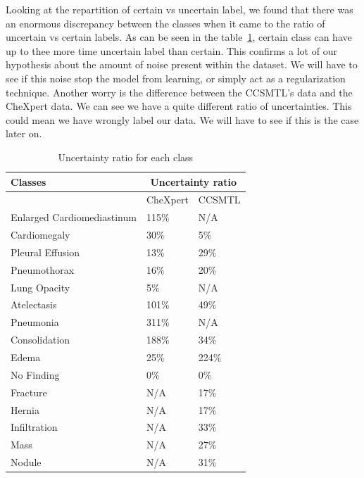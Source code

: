 \documentclass[11pt]{article}
\begin{document}
    Looking at the repartition of certain vs uncertain label, we found that there was an enormous discrepancy between the classes when it came to the ratio of uncertain vs certain labels.
    As can be seen in the table~\ref{tab:uncertainty_ratio}, certain class can have up to thee more time uncertain label than certain. This confirms a lot of our hypothesis about the amount of noise present
    within the dataset. We will have to see if this noise stop the model from learning, or simply act as a regularization technique. Another worry is the difference between the CCSMTL's data and the CheXpert data.
    We can see we have a quite different ratio  of uncertainties. This could mean we have wrongly label our data. We will have to see if this is the case later on.
    \begin{table}[]
        \centering
        \begin{tabular}{@{}lll@{}}
            \toprule
            Classes                    & \multicolumn{2}{c}{Uncertainty ratio} \\ \midrule
                                       & CheXpert           & CCSMTL           \\ \midrule
            Enlarged Cardiomediastinum & 115\%              & N/A              \\
            Cardiomegaly               & 30\%               & 5\%              \\
            Pleural Effusion           & 13\%               & 29\%             \\
            Pneumothorax               & 16\%               & 20\%             \\
            Lung Opacity               & 5\%                & N/A              \\
            Atelectasis                & 101\%              & 49\%             \\
            Pneumonia                  & 311\%              & N/A              \\
            Consolidation              & 188\%              & 34\%             \\
            Edema                      & 25\%               & 224\%            \\
            No Finding                 & 0\%                & 0\%              \\
            Fracture                   & N/A                & 17\%             \\
            Hernia                     & N/A                & 17\%             \\
            Infiltration               & N/A                & 33\%             \\
            Mass                       & N/A                & 27\%             \\
            Nodule                     & N/A                & 31\%             \\ \bottomrule
        \end{tabular}
        \caption{Uncertainty ratio for each class}
        \label{tab:uncertainty_ratio}
    \end{table}
\end{document}
